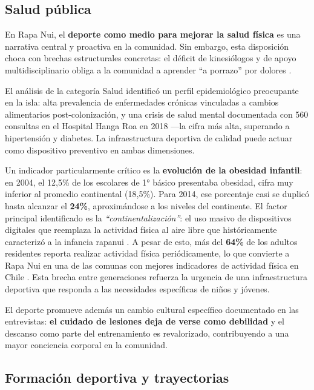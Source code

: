 \documentclass[12pt, a4paper]{article}
\begin{document}
\subsection{Salud pública}

En Rapa Nui, el \textbf{deporte como medio para mejorar la salud física} es una
narrativa central y proactiva en la comunidad. Sin embargo, esta disposición choca
con brechas estructurales concretas: el déficit de kinesiólogos y de apoyo
multidisciplinario obliga a la comunidad a aprender ``a porrazo'' por dolores
\citep{ortega2026}.

El análisis de la categoría Salud identificó un perfil epidemiológico preocupante en
la isla: alta prevalencia de enfermedades crónicas vinculadas a cambios alimentarios
post-colonización, y una crisis de salud mental documentada con 560 consultas en el
Hospital Hanga Roa en 2018 ---la cifra más alta, superando a hipertensión y diabetes.
La infraestructura deportiva de calidad puede actuar como dispositivo preventivo en
ambas dimensiones.

Un indicador particularmente crítico es la \textbf{evolución de la obesidad infantil}:
en 2004, el 12,5\% de los escolares de 1° básico presentaba obesidad, cifra muy
inferior al promedio continental (18,5\%). Para 2014, ese porcentaje casi se duplicó
hasta alcanzar el \textbf{24\%}, aproximándose a los niveles del continente. El factor
principal identificado es la \textit{``continentalización''}: el uso masivo de
dispositivos digitales que reemplaza la actividad física al aire libre que
históricamente caracterizó a la infancia rapanui \citep{ObesidadRapaNui}. A pesar de
esto, más del \textbf{64\%} de los adultos residentes reporta realizar actividad
física periódicamente, lo que convierte a Rapa Nui en una de las comunas con
mejores indicadores de actividad física en Chile \citep{PUCVSalud}. Esta brecha
entre generaciones refuerza la urgencia de una infraestructura deportiva que
responda a las necesidades específicas de niños y jóvenes.

El deporte promueve además un cambio cultural específico documentado en las entrevistas:
\textbf{el cuidado de lesiones deja de verse como debilidad} y el descanso como
parte del entrenamiento es revalorizado, contribuyendo a una mayor conciencia corporal
en la comunidad.

\subsection{Formación deportiva y trayectorias}
\end{document}
